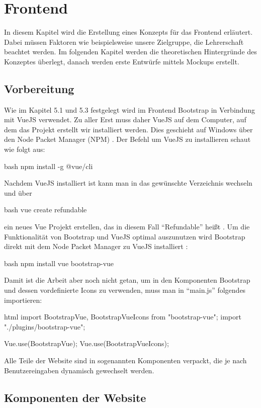 \section{Frontend}
In diesem Kapitel wird die Erstellung eines Konzepts für das Frontend erläutert. Dabei müssen Faktoren wie beispielsweise unsere Zielgruppe, die Lehrerschaft beachtet werden. Im folgenden Kapitel werden die theoretischen Hintergründe des Konzeptes überlegt, danach werden erste Entwürfe mittels Mockups erstellt. 
\subsection{Vorbereitung}
Wie im Kapitel 5.1 und 5.3 festgelegt wird im Frontend Bootstrap in Verbindung mit VueJS verwendet. Zu aller Erst muss daher VueJS auf dem Computer, auf dem das Projekt erstellt wir installiert werden. Dies geschieht auf Windows über den Node Packet Manager (NPM) \cite{vue-install}. Der Befehl um VueJS zu installieren schaut wie folgt aus:
\begin{code}{bash}
	npm install -g @vue/cli
\end{code}
Nachdem VueJS installiert ist kann man in das gewünschte Verzeichnis wechseln und über
\begin{code}{bash}
	vue create refundable
\end{code}
ein neues Vue Projekt erstellen, das in diesem Fall \enquote{Refundable} heißt \cite{vue-create-project}. Um die Funktionalität von Bootstrap und VueJS optimal auszunutzen wird Bootstrap direkt mit dem Node Packet Manager zu VueJS installiert \cite{bootstrap-vue-getting-started}:
\begin{code}{bash}
	npm install vue bootstrap-vue
\end{code}
Damit ist die Arbeit aber noch nicht getan, um in den Komponenten Bootstrap und dessen vordefinierte Icons zu verwenden, muss man in \enquote{main.js} folgendes importieren:
\begin{code}{html}
	import { BootstrapVue, BootstrapVueIcons } from "bootstrap-vue";
	import "./plugins/bootstrap-vue";
	
	Vue.use(BootstrapVue);
	Vue.use(BootstrapVueIcons);
\end{code}
Alle Teile der Website sind in sogenannten Komponenten verpackt, die je nach Benutzereingaben dynamisch gewechselt werden. 

\newpage
\subsection{Komponenten der Website}
